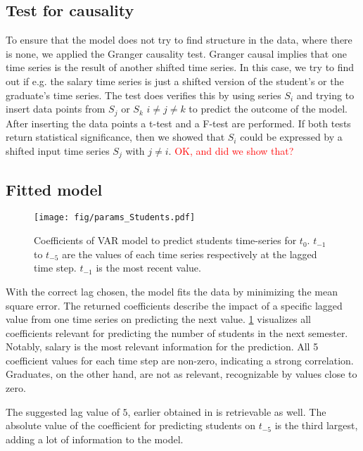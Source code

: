\documentclass{article}
\theoremstyle{plain}
\theoremstyle{definition}
\theoremstyle{remark}
\begin{document}
\subsection{Test for causality}\label{sec:methods:causality}
To ensure that the model does not try to find structure in the data, where there is none, we applied the Granger causality test.
Granger causal implies that one time series is the result of another shifted time series.
In this case, we try to find out if e.g. the salary time series is just a shifted version of the student's or the graduate's time series.
The test does verifies this by using series $S_i$ and trying to insert data points from $S_j$ or $S_k$ $i \neq j\neq k$
to predict the outcome of the model. After inserting the data points a t-test and a F-test are performed. If both
tests return statistical significance, then we showed that $S_i$ could be expressed by a shifted input time series $S_j$ with $j\neq i$.
\textcolor{red}{OK, and did we show that?}


\subsection{Fitted model}\label{sec:methods:fit}
\begin{figure}
    \texttt{[image: fig/params\_Students.pdf]}
    \caption{Coefficients of VAR model to predict students time-series
    for $t_0$. $t_{-1}$ to $t_{-5}$ are the values of each time series respectively at the lagged time step.
    $t_{-1}$ is the most recent value.}
    \label{fig:student coefficients}
\end{figure}




With the correct lag chosen, the model fits the data by minimizing the mean square error.
The returned coefficients describe the impact of a specific lagged value from one time series
on predicting the next value. \ref{fig:student coefficients} visualizes all coefficients
relevant for predicting the number of students in the next semester. 
Notably, salary is the most relevant information for the prediction. All 5
coefficient values for each time step are non-zero, indicating a strong correlation.
Graduates, on the other hand, are not as relevant, recognizable by values close to zero.

The suggested lag value of $5$, earlier obtained in  is retrievable as well.
The absolute value of the coefficient for predicting students on $t_{-5}$ is the third largest, adding
a lot of information to the model.
\end{document}
